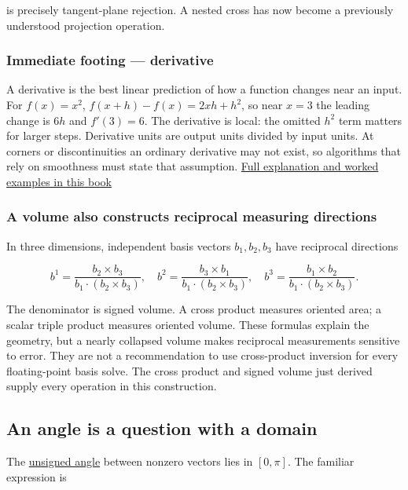 is precisely tangent-plane rejection. A nested cross has now become a previously understood projection operation.

\subsubsection{Immediate footing --- derivative}\label{immediate-footing-derivative}

A derivative is the best linear prediction of how a function changes near an input. For \(f(x)=x^2\), \(f(x+h)-f(x)=2xh+h^2\), so near \(x=3\) the leading change is \(6h\) and \(f'(3)=6\). The derivative is local: the omitted \(h^2\) term matters for larger steps. Derivative units are output units divided by input units. At corners or discontinuities an ordinary derivative may not exist, so algorithms that rely on smoothness must state that assumption. \hyperref[01-foundations-i-ch020]{Full explanation and worked examples in this book}

\subsubsection{A volume also constructs reciprocal measuring directions}\label{a-volume-also-constructs-reciprocal-measuring-directions}

In three dimensions, independent basis vectors \(b_1,b_2,b_3\) have reciprocal directions

\[
b^1=\frac{b_2\times b_3}{b_1\cdot(b_2\times b_3)},\quad
b^2=\frac{b_3\times b_1}{b_1\cdot(b_2\times b_3)},\quad
b^3=\frac{b_1\times b_2}{b_1\cdot(b_2\times b_3)}.
\]

The denominator is signed volume. A cross product measures oriented area; a scalar triple product measures oriented volume. These formulas explain the geometry, but a nearly collapsed volume makes reciprocal measurements sensitive to error. They are not a recommendation to use cross-product inversion for every floating-point basis solve. The cross product and signed volume just derived supply every operation in this construction.

\subsection{An angle is a question with a domain}\label{an-angle-is-a-question-with-a-domain}

The \hyperref[01-foundations-i-ch017]{unsigned angle} between nonzero vectors lies in \([0,\pi]\). The familiar expression is

